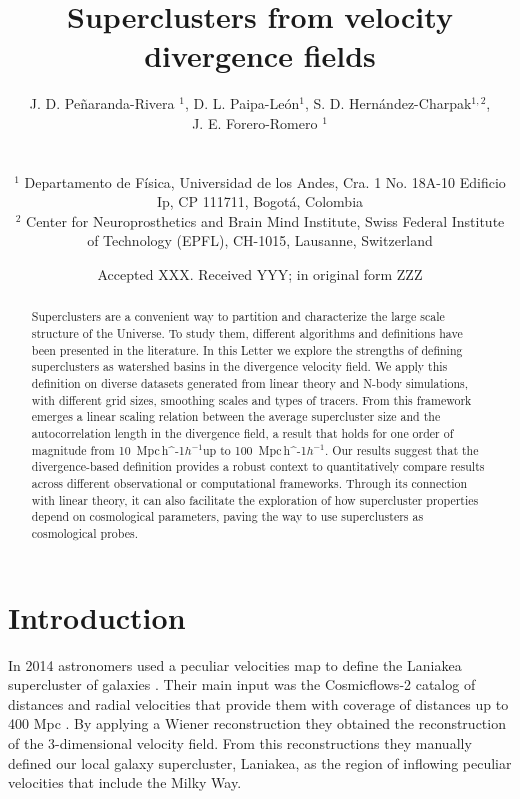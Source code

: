 \documentclass[usenatbib]{mnras}
\title[Superclusters from velocity divergence fields]{Superclusters from velocity divergence fields}
\author[Pe\~naranda-Rivera et al.]{
\parbox[t]{\textwidth}{
    {J. D. Pe\~naranda-Rivera $^1$,} 
    {D. L. Paipa-Le\'on$^{1}$,}
    {S. D. Hern\'andez-Charpak$^{1,2}$,}\\
    {J. E. Forero-Romero $^{1}$}
}
\\\\
$^{1}$ Departamento de F\'isica, Universidad de los Andes, Cra. 1
  No. 18A-10 Edificio Ip, CP 111711, Bogot\'a, Colombia \\
$^{2}$ Center for Neuroprosthetics and Brain Mind Institute, Swiss
  Federal Institute of Technology (EPFL), CH-1015, Lausanne,
  Switzerland\\  
}
\date{Accepted XXX. Received YYY; in original form ZZZ}
\newcommand{\Mpch}{\,{\rm Mpc}\,\ifmmode h^{-1}\else $h^{-1}$\fi}
\begin{document}
\label{firstpage}
\pagerange{\pageref{firstpage}--\pageref{lastpage}}
\maketitle

\maketitle
\begin{abstract}
Superclusters are a convenient way to partition and characterize the large scale structure of the Universe.
To study them, different algorithms and definitions have been presented in the literature.
In this Letter we explore the strengths of defining superclusters as watershed basins in the divergence velocity field.
We apply this definition on diverse datasets generated from linear theory and  N-body simulations, with different grid sizes, smoothing scales and types of tracers.
From this framework emerges a linear scaling relation between the average supercluster size and the autocorrelation length in the divergence field, a result that holds for one order of magnitude from 10 \Mpch up to 100 \Mpch.
Our results suggest that the divergence-based definition provides a robust context to quantitatively compare results across different observational or computational frameworks. 
Through its connection with linear theory, it can also facilitate the exploration of how supercluster properties depend on cosmological parameters, 
paving the way to use superclusters as cosmological probes.
\end{abstract}

\begin{keywords}
\end{keywords}




\section{Introduction}


In 2014 astronomers used a peculiar velocities map  to 
define the Laniakea supercluster of galaxies
\citep{2014Natur.513...71T}.  
Their main input was the Cosmicflows-2 catalog of distances and radial
velocities that provide them with coverage of distances up to 400 Mpc
\citep{2013AJ....146...86T}. 
By applying a Wiener reconstruction  \citep{Zaroubi_1999} they obtained the
reconstruction of the 3-dimensional velocity field. 
From this reconstructions they manually defined our local galaxy supercluster, Laniakea, as the region of inflowing peculiar velocities that include the Milky Way. 
\end{document}
